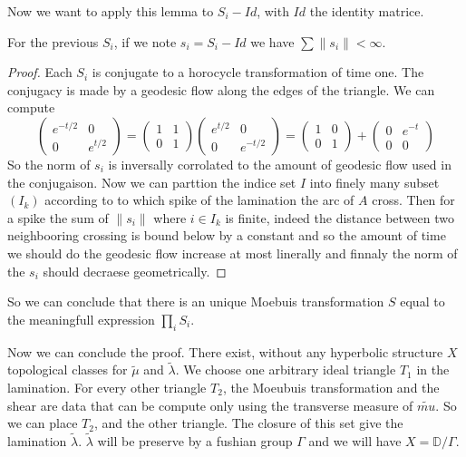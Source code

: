 Now we want to apply this lemma to $S_i - Id$, with $Id$ the identity matrice.

\begin{lem}
For the previous $S_i$, if we note $s_i=S_i - Id$ we have $\sum \| s_i \| < \infty$.
\end{lem}

\begin{proof}
Each $S_i$ is conjugate to a horocycle transformation of time one. The conjugacy is made by a geodesic flow along the edges of the triangle. We can compute \[
\begin{pmatrix} e^{-t/2} & 0 \\ 0 & e^{t/2} \end{pmatrix} = \begin{pmatrix} 1 & 1 \\ 0 & 1 \end{pmatrix} \begin{pmatrix} e^{t/2} & 0 \\ 0 & e^{-t/2} \end{pmatrix} = \begin{pmatrix} 1 & 0 \\ 0 & 1 \end{pmatrix}+ \begin{pmatrix} 0 & e^{-t} \\ 0 & 0 \end{pmatrix}
\]
So the norm of $s_i$ is inversally corrolated to the amount of geodesic flow used in the conjugaison.
Now we can parttion the indice set $I$ into finely many subset $(I_k)$ according to to which spike of the lamination the arc of $A$ cross.
Then for a spike the sum of $\|s_i \|$ where $i \in I_k$ is finite, indeed the distance between two neighbooring crossing is bound below by a constant and so the amount of time we should do the geodesic flow increase at most linerally and finnaly the norm of the $s_i$ should decraese geometrically.
\end{proof}

So we can conclude that there is an unique Moebuis transformation $S$ equal to the meaningfull expression $\prod_i S_i$.

Now we can conclude the proof. There exist, without any hyperbolic structure $X$  topological classes for $\tilde{\mu}$ and $\tilde{\lambda}$. We choose one arbitrary ideal triangle $T_1$ in the lamination. For every other triangle $T_2$, the Moeubuis transformation and the shear are data that can be compute only using the transverse measure of $\tilde{mu}$. So we can place $T_2$, and the other triangle. The closure of this set give the lamination $\tilde{\lambda}$. $\tilde{\lambda}$ will be preserve by a fushian group $\Gamma$ and we will have $X=\mathbb{D}  / \Gamma$.

